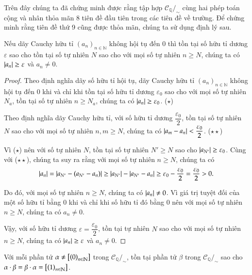 Trên đây chúng ta đã chứng minh được rằng tập hợp $\mathscr{C}_{\mathbb{Q}}/_{\sim}$ cùng hai phép toán cộng và nhân thỏa mãn 8 tiên đề đầu tiên trong các tiên đề về trường. Để chứng minh rằng tiên đề thứ 9 cũng được thỏa mãn, chúng ta sử dụng định lý sau.
\begin{appendixthm}\label{appendixthm:nonzero-cauchy-sequences}
    Nếu dãy Cauchy hữu tỉ ${(a_{n})}_{n\in\mathbb{N}}$ không hội tụ đến $0$ thì tồn tại số hữu tỉ dương $\varepsilon$ sao cho tồn tại số tự nhiên $N$ sao cho với mọi số tự nhiên $n\geq N$, chúng ta có $\left\vert{a_{n}}\right\vert\geq \varepsilon$ và $a_{n}\ne 0$.
\end{appendixthm}

\begin{proof}
    Theo định nghĩa dãy số hữu tỉ hội tụ, dãy Cauchy hữu tỉ ${(a_{n})}_{n\in\mathbb{N}}$ không hội tụ đến $0$ khi và chỉ khi tồn tại số hữu tỉ dương $\varepsilon_{0}$ sao cho với mọi số tự nhiên $N_{a}$, tồn tại số tự nhiên $n\geq N_{a}$, chúng ta có $\left\vert{a_{n}}\right\vert \geq \varepsilon_{0}$. ($\star$)

    Theo định nghĩa dãy Cauchy hữu tỉ, với số hữu tỉ dương $\dfrac{\varepsilon_{0}}{2}$, tồn tại số tự nhiên $N$ sao cho với mọi số tự nhiên $n, m\geq N$, chúng ta có $\left\vert{a_{m} - a_{n}}\right\vert < \dfrac{\varepsilon_{0}}{2}$. ($\star\star$)

    Vì ($\star$) nên với số tự nhiên $N$, tồn tại số tự nhiên $N'\geq N$ sao cho $\left\vert{a_{N'}}\right\vert \geq \varepsilon_{0}$. Cùng với ($\star\star$), chúng ta suy ra rằng với mọi số tự nhiên $n\geq N$, chúng ta có
    \[
        \left\vert{a_{n}}\right\vert = \left\vert{a_{N'} - (a_{N'} - a_{n})}\right\vert \geq \left\vert{a_{N'}}\right\vert - \left\vert{a_{N'} - a_{n}}\right\vert \geq \varepsilon_{0} - \frac{\varepsilon_{0}}{2} = \frac{\varepsilon_{0}}{2} > 0.
    \]

    Do đó, với mọi số tự nhiên $n\geq N$, chúng ta có $\left\vert{a_{n}}\right\vert\ne 0$. Vì giá trị tuyệt đối của một số hữu tỉ bằng $0$ khi và chỉ khi số hữu tỉ đó bằng $0$ nên với mọi số tự nhiên $n\geq N$, chúng ta có $a_{n}\ne 0$.

    Vậy, với số hữu tỉ dương $\varepsilon = \dfrac{\varepsilon_{0}}{2}$, tồn tại tự nhiên $N$ sao cho với mọi số tự nhiên $n\geq N$, chúng ta có $\left\vert{a_{n}}\right\vert\geq \varepsilon$ và $a_{n}\ne 0$.
\end{proof}

\begin{appendixthm}
    Với mỗi phần tử $\alpha\ne \left[{\left({0}\right)}_{{n}\in\mathbb{N}}\right]$ trong $\mathscr{C}_{\mathbb{Q}}/_{\sim}$, tồn tại phần tử $\beta$ trong $\mathscr{C}_{\mathbb{Q}}/_{\sim}$ sao cho $\alpha\cdot\beta = \beta\cdot\alpha = \left[{\left({1}\right)}_{{n}\in\mathbb{N}}\right]$.
\end{appendixthm}

